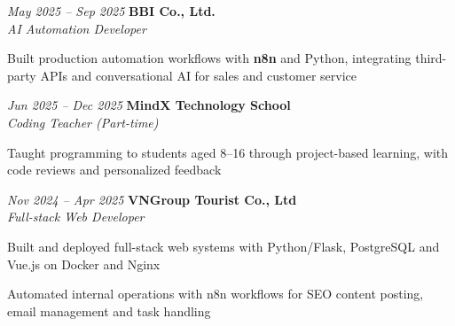 \begin{twocolentry}{\textit{May 2025 -- Sep 2025}}
    \textbf{BBI Co., Ltd.} \\[4pt]
    \textit{AI Automation Developer}
\end{twocolentry}
\begin{onecolentry}
    \begin{highlights}
        \item Built production automation workflows with \textbf{n8n} and Python, integrating third-party APIs and conversational AI for sales and customer service
    \end{highlights}
\end{onecolentry}
\vspace{0.2 cm}

\begin{twocolentry}{\textit{Jun 2025 -- Dec 2025}}
    \textbf{MindX Technology School} \\[4pt]
    \textit{Coding Teacher (Part-time)}
\end{twocolentry}
\begin{onecolentry}
    \begin{highlights}
        \item Taught programming to students aged 8--16 through project-based learning, with code reviews and personalized feedback
    \end{highlights}
\end{onecolentry}
\vspace{0.2 cm}

\begin{twocolentry}{\textit{Nov 2024 -- Apr 2025}}
    \textbf{VNGroup Tourist Co., Ltd} \\[4pt]
    \textit{Full-stack Web Developer}
\end{twocolentry}
\begin{onecolentry}
    \begin{highlights}
        \item Built and deployed full-stack web systems with Python/Flask, PostgreSQL and Vue.js on Docker and Nginx
        \item Automated internal operations with n8n workflows for SEO content posting, email management and task handling
    \end{highlights}
\end{onecolentry}


